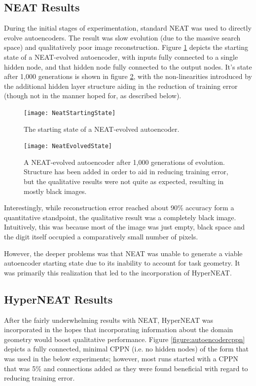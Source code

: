 \documentclass{acm_proc_article-sp}
\begin{document}
\subsection{NEAT Results}
During the initial stages of experimentation, standard NEAT was used to directly evolve autoencoders.  The result was slow evolution (due to the massive search space) and qualitatively poor image reconstruction.  Figure \ref{figure:neatstartingnetwork} depicts the starting state of a NEAT-evolved autoencoder, with inputs fully connected to a single hidden node, and that hidden node fully connected to the output nodes.  It's state after 1,000 generations is shown in figure \ref{figure:neatevolvednetwork}, with the non-linearities introduced by the additional hidden layer structure aiding in the reduction of training error (though not in the manner hoped for, as described below).

\begin{figure}[h]
	\caption{The starting state of a NEAT-evolved autoencoder.}
	\centering
	\texttt{[image: NeatStartingState]}
	\label{figure:neatstartingnetwork}
\end{figure}

\begin{figure}[h]
	\caption{A NEAT-evolved autoencoder after 1,000 generations of evolution.  Structure has been added in order to aid in reducing training error, but the qualitative results were not quite as expected, resulting in mostly black images.}
	\centering
	\texttt{[image: NeatEvolvedState]}
	\label{figure:neatevolvednetwork}
\end{figure}

Interestingly, while reconstruction error reached about 90\% accuracy form a quantitative standpoint, the qualitative result was a completely black image.  Intuitively, this was because most of the image was just empty, black space and the digit itself occupied a comparatively small number of pixels.

However, the deeper problems was that NEAT was unable to generate a viable autoencoder starting state due to its inability to account for task geometry.  It was primarily this realization that led to the incorporation of HyperNEAT.

\subsection{HyperNEAT Results}

After the fairly underwhelming results with NEAT, HyperNEAT was incorporated in the hopes that incorporating information about the domain geometry would boost qualitative performance.  Figure \ref{figure:autoencodercppn} depicts a fully connected, minimal CPPN (i.e. no hidden nodes) of the form that was used in the below experiments; however, most runs started with a CPPN that was 5\% and connections added as they were found beneficial with regard to reducing training error.  
\end{document}
